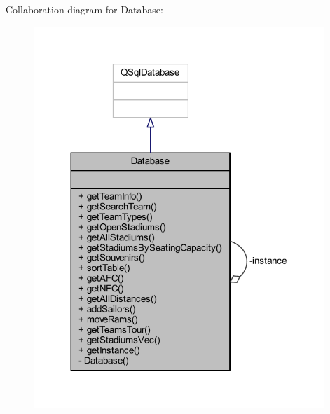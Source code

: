 Collaboration diagram for Database\+:
\nopagebreak
\begin{figure}[H]
\begin{center}
\leavevmode
\includegraphics[width=311pt]{class_database__coll__graph}
\end{center}
\end{figure}
